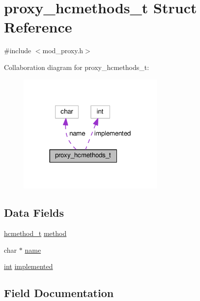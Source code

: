 \hypertarget{structproxy__hcmethods__t}{}\section{proxy\+\_\+hcmethods\+\_\+t Struct Reference}
\label{structproxy__hcmethods__t}


{\ttfamily \#include $<$mod\+\_\+proxy.\+h$>$}



Collaboration diagram for proxy\+\_\+hcmethods\+\_\+t\+:
\nopagebreak
\begin{figure}[H]
\begin{center}
\leavevmode
\includegraphics[width=204pt]{structproxy__hcmethods__t__coll__graph}
\end{center}
\end{figure}
\subsection*{Data Fields}
\begin{DoxyCompactItemize}
\item 
\hyperlink{group__MOD__PROXY_ga4e8622ade6bde29385df7b89c9b94e71}{hcmethod\+\_\+t} \hyperlink{structproxy__hcmethods__t_a7bb77d4d3e11c52565841d119438a139}{method}
\item 
char $\ast$ \hyperlink{structproxy__hcmethods__t_a31085efe0b3c49a5ffce47d7312be501}{name}
\item 
\hyperlink{pcre_8txt_a42dfa4ff673c82d8efe7144098fbc198}{int} \hyperlink{structproxy__hcmethods__t_a2103f2b31be964ea6b43035e044291e1}{implemented}
\end{DoxyCompactItemize}


\subsection{Field Documentation}
